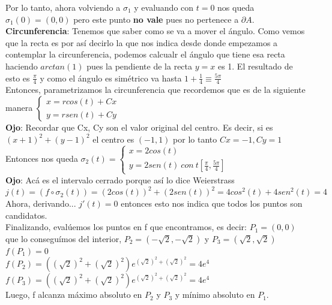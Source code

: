 \documentclass[10pt,a4paper]{article}
\begin{document}
Por lo tanto, ahora volviendo a $\sigma_{1}$ y evaluando con $t=0$ nos queda $\sigma_{1}(0) = (0, 0)$ pero este punto \textbf{no vale} pues no pertenece a $\partial A$. \\
\textbf{Circunferencia}: Tenemos que saber como se va a mover el ángulo. Como vemos que la recta es por así decirlo la que nos indica desde donde empezamos a contemplar la circunferencia, podemos calcualr el ángulo que tiene esa recta haciendo $arctan(1)$ pues la pendiente de la recta $y=x$ es 1. El resultado de esto es $\frac{\pi}{4}$ y como el ángulo es simétrico va hasta $1 + \frac{1}{4} \equiv \frac{5\pi}{4}$ \\
Entonces, parametrizamos la circunferencia que recordemos que es de la siguiente manera 
$\begin{cases}
    x = r cos(t) + Cx \\
    y = r sen(t) + Cy 
\end{cases}$ \\
\textbf{Ojo}: Recordar que Cx, Cy son el valor original del centro. Es decir, si es $(x+1)^{2} + (y-1)^{2}$ el centro es $(-1, 1)$ por lo tanto $Cx = -1, Cy = 1$ \\
Entonces nos queda 
$\sigma_{2}(t) = \begin{cases}
    x = 2 cos(t) \\
    y = 2 sen(t) \ con \ t [\frac{\pi}{4}, \frac{5\pi}{4}]
\end{cases}$ \\
\textbf{Ojo}: Acá es el intervalo cerrado porque así lo dice Weierstrass \\
$j(t) = (f \circ \sigma_{2}(t)) = (2cos(t))^{2} + (2sen(t))^{2} = 4cos^{2}(t) + 4sen^{2}(t) = 4 $ \\
Ahora, derivando... $j'(t) = 0$ entonces esto nos indica que todos los puntos son candidatos. \\
Finalizando, evalúemos los puntos en f que encontramos, es decir: $P_{1} = (0,0)$ que lo conseguímos del interior, $P_{2} = (-\sqrt{2}, -\sqrt{2}) $ y $P_{3} = (\sqrt{2}, \sqrt{2})$ \\
$f(P_{1}) = 0$ \\
$f(P_{2}) = ((\sqrt{2})^{2} + (\sqrt{2})^{2}) e^{(\sqrt{2})^{2} + (\sqrt{2})^{2}} = 4 e^{4}$ \\
$f(P_{3}) = ((\sqrt{2})^{2} + (\sqrt{2})^{2}) e^{(\sqrt{2})^{2} + (\sqrt{2})^{2}} = 4 e^{4}$ \\ 
Luego, f alcanza máximo absoluto en $P_{2}$ y $P_{3}$ y mínimo absoluto en $P_{1}$.
\end{document}
